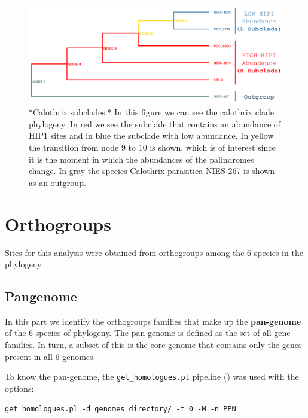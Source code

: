 \documentclass[
]{book}
\begin{document}
\begin{figure}

{\centering \includegraphics[width=1\linewidth]{figures/4x/philogenie_subclades} 

}

\caption{*Calothrix subclades.* In this figure we can see the calothrix clade phylogeny. In red we see the subclade that contains an abundance of HIP1 sites and in blue the subclade with low abundance. In yellow the transition from node 9 to 10 is shown, which is of interest since it is the moment in which the abundances of the palindromes change. In gray the species Calothrix parasitica NIES 267 is shown as an outgroup.}\label{fig:FIG3x}
\end{figure}

\hypertarget{orthogroups}{%
\section{Orthogroups}\label{orthogroups}}

Sites for this analysis were obtained from orthogroups among the 6 species in the phylogeny.

\hypertarget{pangenome}{%
\subsection{Pangenome}\label{pangenome}}

In this part we identify the orthogroups families that make up the \textbf{pan-genome} of the 6 species of phylogeny. The pan-genome is defined as the set of all gene families. In turn, a subset of this is the core genome that contains only the genes present in all 6 genomes.

To know the pan-genome, the \texttt{get\_homologues.pl} pipeline (\citet{contreras2013get_homologues}) was used with the options:

\begin{verbatim}
get_homologues.pl -d genomes_directory/ -t 0 -M -n PPN 
\end{verbatim}
\end{document}
